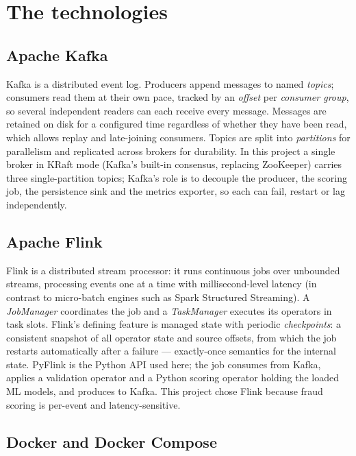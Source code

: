 \documentclass[11pt,a4paper]{article}
\begin{document}
\clearpage

\appendix

\section{The technologies}

\subsection{Apache Kafka}

Kafka is a distributed event log. Producers append messages to named
\emph{topics}; consumers read them at their own pace, tracked by an
\emph{offset} per \emph{consumer group}, so several independent readers can
each receive every message. Messages are retained on disk for a configured
time regardless of whether they have been read, which allows replay and
late-joining consumers. Topics are split into \emph{partitions} for
parallelism and replicated across brokers for durability. In this project a
single broker in KRaft mode (Kafka's built-in consensus, replacing ZooKeeper)
carries three single-partition topics; Kafka's role is to decouple the
producer, the scoring job, the persistence sink and the metrics exporter, so
each can fail, restart or lag independently.

\subsection{Apache Flink}

Flink is a distributed stream processor: it runs continuous jobs over
unbounded streams, processing events one at a time with millisecond-level
latency (in contrast to micro-batch engines such as Spark Structured
Streaming). A \emph{JobManager} coordinates the job and a \emph{TaskManager}
executes its operators in task slots. Flink's defining feature is managed
state with periodic \emph{checkpoints}: a consistent snapshot of all operator
state and source offsets, from which the job restarts automatically after a
failure --- exactly-once semantics for the internal state. PyFlink is the
Python API used here; the job consumes from Kafka, applies a validation
operator and a Python scoring operator holding the loaded ML models, and
produces to Kafka. This project chose Flink because fraud scoring is
per-event and latency-sensitive.

\subsection{Docker and Docker Compose}
\end{document}
